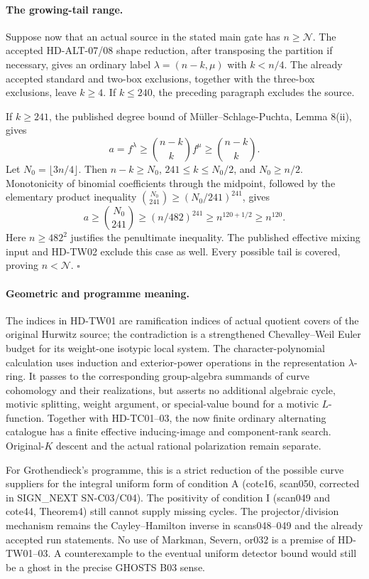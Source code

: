 \paragraph{The growing-tail range.}
Suppose now that an actual source in the stated main gate has
\(n\ge\mathcal N\).
The accepted HD-ALT-07/08 shape reduction, after transposing the partition
if necessary, gives an ordinary label \(\lambda=(n-k,\mu)\) with
\(k<n/4\).  The already accepted standard and two-box exclusions, together
with the three-box exclusions, leave \(k\ge4\).
If \(k\le240\), the preceding paragraph excludes the source.

If \(k\ge241\), the published degree bound of
M\"uller--Schlage-Puchta, Lemma 8(ii),\cite{HD:MSP2007} gives
\[
 a=f^\lambda\ge\binom{n-k}{k}f^\mu
              \ge\binom{n-k}{k}.
 \tag{TW.28}
\]
Let \(N_0=\lfloor3n/4\rfloor\).
Then \(n-k\ge N_0\), \(241\le k\le N_0/2\), and \(N_0\ge n/2\).
Monotonicity of binomial coefficients through the midpoint, followed by
the elementary product inequality
\(\binom{N_0}{241}\ge(N_0/241)^{241}\), gives
\[
 a\ge\binom{N_0}{241}
   \ge(n/482)^{241}
   \ge n^{120+1/2}\ge n^{120}.
 \tag{TW.29}
\]
Here \(n\ge482^2\) justifies the penultimate inequality.
The published effective mixing input and HD-TW02 exclude this case as well.
Every possible tail is covered, proving \(n<\mathcal N\). \(\square\)

\paragraph{Geometric and programme meaning.}
The indices in HD-TW01 are ramification indices of actual quotient covers
of the original Hurwitz source; the contradiction is a strengthened
Chevalley--Weil Euler budget for its weight-one isotypic local system.
The character-polynomial calculation uses induction and exterior-power
operations in the representation \(\lambda\)-ring.  It passes to the
corresponding group-algebra summands of curve cohomology and their
realizations, but asserts no additional algebraic cycle, motivic splitting,
weight argument, or special-value bound for a motivic \(L\)-function.
Together with HD-TC01--03, the now finite ordinary alternating catalogue
has a finite effective inducing-image and component-rank search.
Original-\(K\) descent and the actual rational polarization remain separate.

For Grothendieck's programme, this is a strict reduction of the possible
curve suppliers for the integral uniform form of condition A
(cote16, scan050, corrected in SIGN_NEXT SN-C03/C04).
The positivity of condition I (scan049 and cote44, Theorem4) still cannot
supply missing cycles.  The projector/division mechanism remains the
Cayley--Hamilton inverse in scans048--049 and the already accepted run
statements.  No use of Markman, Severn, or032 is a premise of HD-TW01--03.
A counterexample to the eventual uniform detector bound would still be
a ghost in the precise GHOSTS B03 sense.


